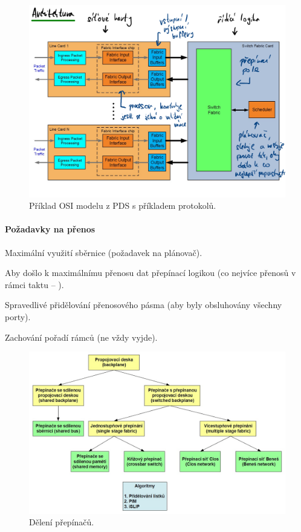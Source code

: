 \begin{figure}[H]
    \centering
    \includegraphics[width=1\linewidth]{obecna_architektura.pdf}
    \caption{Příklad OSI modelu z PDS s příkladem protokolů.}
\end{figure}

\paragraph*{Požadavky na přenos} \begin{compactitem}
    \item Maximální využití sběrnice (požadavek na plánovač). \begin{compactitem}
        \item Aby došlo k maximálnímu přenosu dat přepínací logikou (co nejvíce přenosů v rámci taktu -- ).
    \end{compactitem}
    \item Spravedlivé přidělování přenosového pásma (aby byly obsluhovány všechny porty).
    \item Zachování pořadí rámců (ne vždy vyjde).
\end{compactitem}

\begin{figure}[H]
    \centering
    \includegraphics[width=1\linewidth]{deleni_prepinacu.png}
    \caption{Dělení přepínačů.}
\end{figure}

